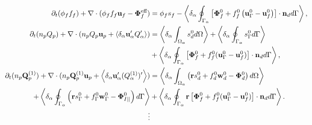 \begin{align}
    \partial_t (\phi_f f_f)
    +\mathbf{\nabla}\cdot (\phi_f f_f \textbf{u}_f - \mathbf{\Phi}_f^\text{eff})
    &= 
    \phi_f s_f
    - \left<\delta_\alpha \oint_{\Gamma_{\alpha}} \left[
        \mathbf{\Phi}_f^0
        + f_f^0
        \left(
            \textbf{u}_\Gamma^0
            - \textbf{u}_f^0
        \right)
    \right]
    \cdot \textbf{n}_d d\Gamma\right> ,
    \label{eq:avg_hybrid_dt_chi_f}\\
        \partial_t (n_pQ_p)
        + \mathbf{\nabla}\cdot (n_p Q_p \textbf{u}_p + \left<\delta_\alpha \textbf{u}_\alpha' Q_\alpha'\right>)
        &= \left<\delta_\alpha \int_{\Omega_{\alpha}}  s_d^0  d\Omega\right>
        + \left<\delta_\alpha \oint_{\Gamma_{\alpha}}  s_\Gamma^0  d\Gamma\right>\nonumber\\
        &+ \left<\delta_\alpha \oint_{\Gamma_{\alpha}}  \left[\mathbf{\Phi}_f^0 + f_f^0 (\textbf{u}_\Gamma^0-\textbf{u}_f^0) \right] \cdot \textbf{n}_d  d\Gamma\right>,
        \label{eq:avg_hybrid_q}
        \\
        \partial_t (n_p\textbf{Q}_p^{(1)})
        + \mathbf{\nabla}\cdot (n_p \textbf{Q}_p^{(1)} \textbf{u}_p + \left<\delta_\alpha \textbf{u}_\alpha' (Q_\alpha^{(1)})'\right>)
        &=\left<\delta_\alpha \int_{\Omega_{\alpha}}  \left(
            \textbf{r} s_d^0         
            + f_d^0  \textbf{w}_d^0 
            - \mathbf{\Phi}_d^0
        \right)  d\Omega\right>\nonumber\\
        + \left<\delta_\alpha \oint_{\Gamma_{\alpha}}  \left(
            \textbf{r}s_\Gamma^0
            + f_\Gamma^0 \textbf{w}_\Gamma^0
            - \mathbf{\Phi}_{I||}^0
        \right)  d\Gamma\right>
        &+ \left<\delta_\alpha \oint_{\Gamma_{\alpha}}  \textbf{r} \left[
            \mathbf{\Phi}_f^0
            + f_f^0 (\textbf{u}_\Gamma^0-\textbf{u}_f^0)
        \right]\cdot \textbf{n}_d   d\Gamma\right>.
        \label{eq:avg_hybrid_q_1}
        \\\nonumber
        \vdots
\end{align}
